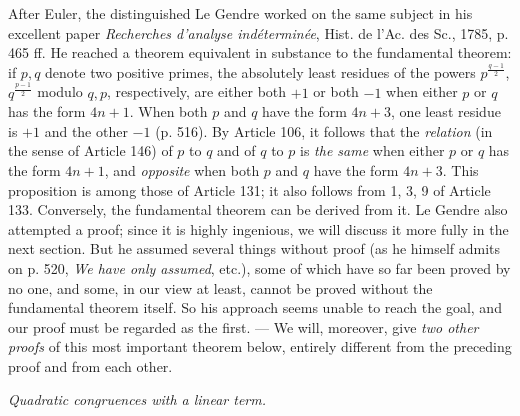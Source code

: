 After Euler, the distinguished Le Gendre worked on the same subject in his excellent paper \textit{Recherches d'analyse indéterminée}, Hist. de l'Ac. des Sc., 1785, p. 465 ff. He reached a theorem equivalent in substance to the fundamental theorem: if $p,q$ denote two positive primes, the absolutely least residues of the powers $p^{\frac{q-1}{2}}$, $q^{\frac{p-1}{2}}$ modulo $q,p$, respectively, are either both $+1$ or both $-1$ when either $p$ or $q$ has the form $4n+1$. When both $p$ and $q$ have the form $4n+3$, one least residue is $+1$ and the other $-1$ (p. 516). By Article 106, it follows that the \textit{relation} (in the sense of Article 146) of $p$ to $q$ and of $q$ to $p$ is \textit{the same} when either $p$ or $q$ has the form $4n+1$, and \textit{opposite} when both $p$ and $q$ have the form $4n+3$. This proposition is among those of Article 131; it also follows from 1, 3, 9 of Article 133. Conversely, the fundamental theorem can be derived from it. Le Gendre also attempted a proof; since it is highly ingenious, we will discuss it more fully in the next section. But he assumed several things without proof (as he himself admits on p. 520, \textit{We have only assumed}, etc.), some of which have so far been proved by no one, and some, in our view at least, cannot be proved without the fundamental theorem itself. So his approach seems unable to reach the goal, and our proof must be regarded as the first. --- We will, moreover, give \textit{two other proofs} of this most important theorem below, entirely different from the preceding proof and from each other.

\begin{center}\textit{Quadratic congruences with a linear term.}\end{center}

